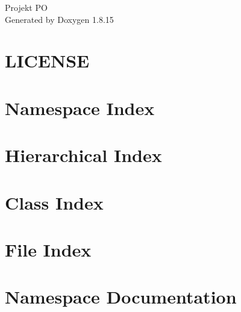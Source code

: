 \let\mypdfximage\pdfximage\def\pdfximage{\immediate\mypdfximage}\documentclass[twoside]{book}
\newcommand{\+}{\discretionary{\mbox{\scriptsize$\hookleftarrow$}}{}{}}
\newcommand{\clearemptydoublepage}{%
  \newpage{\pagestyle{empty}\cleardoublepage}%
}
\begin{document}
\hypersetup{pageanchor=false,
             bookmarksnumbered=true,
             pdfencoding=unicode
            }
\begin{titlepage}
\vspace*{7cm}
\begin{center}%
{\Large Projekt PO }\\
\vspace*{1cm}
{\large Generated by Doxygen 1.8.15}\\
\end{center}
\end{titlepage}
\clearemptydoublepage
{}
\tableofcontents
\clearemptydoublepage
{}
\hypersetup{pageanchor=true}

\chapter{L\+I\+C\+E\+N\+SE}
\label{md_packages__newtonsoft_8_json_812_80_81__l_i_c_e_n_s_e}

\chapter{Namespace Index}

\chapter{Hierarchical Index}

\chapter{Class Index}

\chapter{File Index}

\chapter{Namespace Documentation}








\end{document}
